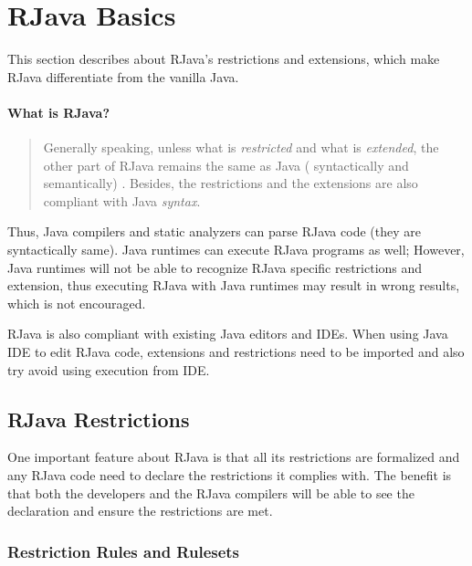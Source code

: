 \documentclass[12pt]{article}
\begin{document}
\setcounter{secnumdepth}{5}
\setcounter{tocdepth}{5}
\tableofcontents 
\clearpage


\section{RJava Basics}

This section describes about RJava's restrictions and extensions, 
which make RJava differentiate from the vanilla Java. 

\paragraph*{What is RJava?}
\begin{quotation}
Generally speaking, unless what is \emph{restricted} and 
what is \emph{extended},
the other part of RJava remains the same as Java (
syntactically and semantically) . Besides,
the restrictions and the extensions are also
compliant with Java \emph{syntax}. 
\end{quotation}

\noindent
Thus, Java compilers and static analyzers can 
parse RJava code (they are syntactically same).
Java runtimes can
execute RJava programs as well; However, Java runtimes
will not be able to recognize RJava
specific restrictions and extension, thus executing
RJava with Java runtimes may result in wrong results, which
is not encouraged. 

RJava is also compliant with existing Java editors and IDEs. 
When using Java IDE to edit RJava code, extensions and restrictions
need to be imported and also try avoid using execution from IDE. 

\subsection{RJava Restrictions}

One important feature about RJava is that all its restrictions 
are formalized and any RJava code need to declare the restrictions
it complies with. The benefit is that both the developers
and the RJava compilers will be able to see the declaration
and ensure the restrictions are met. 

\subsubsection{Restriction Rules and Rulesets}
\end{document}
